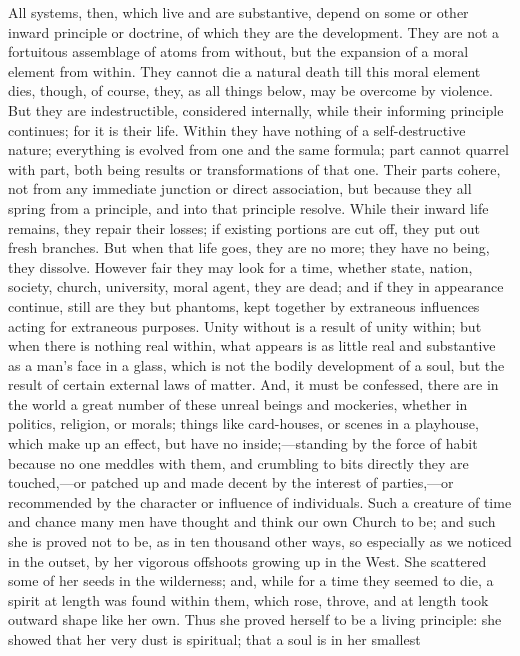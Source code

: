 All systems, then, which live and are
substantive, depend on some or other inward principle or doctrine, of
which they are the development. They are not a fortuitous assemblage
of atoms from without, but the expansion of a moral element from
within. They cannot die a natural death till this moral element dies,
though, of course, they, as all things below, may be overcome by
violence. But they are indestructible, considered internally, while
their informing principle continues; for it is their life. Within they
have nothing of a self-destructive nature; everything is evolved from
one and the same formula; part cannot quarrel with part, both being
results or transformations of that one. Their parts cohere, not from
any immediate junction or direct association, but because they all
spring from a principle, and into that principle resolve. While their
inward life remains, they repair their losses; if existing portions
are cut off, they put out fresh branches. But when that life goes,
they are no more; they have no being, they dissolve. However fair they
may look for a time, whether state, nation, society, church,
university, moral agent, they are dead; and if they in appearance
continue, still are they but phantoms, kept together by extraneous
influences acting for extraneous purposes. Unity without is a result
of unity within; but when there is nothing real within, what appears
is as little real and substantive as a man's face in a glass, which is
not the bodily development of a soul, but the result of certain
external laws of matter. And, it must be confessed, there are in
the world a great number of these unreal beings and mockeries, whether
in politics, religion, or morals; things like card-houses, or scenes
in a playhouse, which make up an effect, but have no
inside;—standing by the force of habit because no one meddles with
them, and crumbling to bits directly they are touched,—or patched up
and made decent by the interest of parties,—or recommended by the
character or influence of individuals. Such a creature of time and
chance many men have thought and think our own Church to be; and such
she is proved not to be, as in ten thousand other ways, so especially
as we noticed in the outset, by her vigorous offshoots growing up in
the West. She scattered some of her seeds in the wilderness; and,
while for a time they seemed to die, a spirit at length was found
within them, which rose, throve, and at length took outward shape like
her own. Thus she proved herself to be a living principle: she showed
that her very dust is spiritual; that a soul is in her smallest
